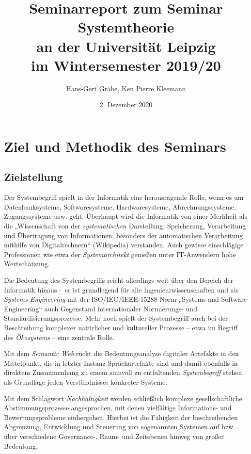 \documentclass[11pt,a4paper]{article}
\title{Seminarreport zum Seminar Systemtheorie\\[6pt] an der Universität
  Leipzig\\ im Wintersemester 2019/20}
\author{Hans-Gert Gr\"abe, Ken Pierre Kleemann}
\date{2. Dezember 2020}
\begin{document}
\maketitle
\tableofcontents
\clearpage

\section{Ziel und Methodik des Seminars}

\subsection{Zielstellung}

Der Systembegriff spielt in der Informatik eine herausragende Rolle, wenn es
um Datenbanksysteme, Softwaresysteme, Hardwaresysteme, Abrechnungssysteme,
Zugangssysteme usw. geht.  Überhaupt wird die Informatik von einer Merhheit
als die „Wissenschaft von der \emph{systematischen} Darstellung, Speicherung,
Verarbeitung und Übertragung von Informationen, besonders der automatischen
Verarbeitung mithilfe von Digitalrechnern“ (Wikipedia) verstanden.  Auch
gewisse einschlägige Professionen wie etwa der \emph{Systemarchitekt} genießen
unter IT-Anwendern hohe Wertschätzung.

Die Bedeutung des Systembegriffs reicht allerdings weit über den Bereich der
Informatik hinaus -- er ist grundlegend für alle Ingenieurwissenschaften und
als \emph{Systems Engineering} mit der ISO/IEC/IEEE-15288 Norm „Systems and
Software Engineering“ auch Gegenstand internationaler Normierungs- und
Standardisierungsprozesse.  Mehr noch spielt der Systembegriff auch bei der
Beschreibung komplexer natürlicher und kultureller Prozesse -- etwa im Begriff
des \emph{Ökosystems} -- eine zentrale Rolle.

Mit dem \emph{Semantic Web} rückt die Bedeutungsanalyse digitaler Artefakte in
den Mittelpunkt, die in letzter Instanz Sprachartefakte sind und damit
ebenfalls in direktem Zusammenhang zu einem sinnvoll zu entfaltenden
\emph{Systembegriff} stehen als Grundlage jeden Verständnisses konkreter
Systeme.

Mit dem Schlagwort \emph{Nachhaltigkeit} werden schließlich komplexe
gesellschaftliche Abstimmungsprozesse angesprochen, mit denen vielfältige
Informations- und Bewertungsprobleme einhergehen. Hierbei ist die Fähigkeit
der beschreibenden Abgrenzung, Entwicklung und Steuerung von sogenannten
Systemen auf bzw. über verschiedene Governance-, Raum- und Zeitebenen hinweg
von großer Bedeutung.
\end{document}
